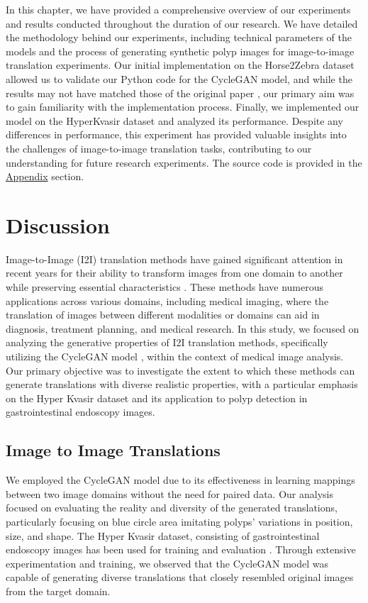 \documentclass[UKenglish,12pt]{master-style}
\begin{document}
In this chapter, we have provided a comprehensive overview of our experiments and results conducted throughout the duration of our research. We have detailed the methodology behind our experiments, including technical parameters of the models and the process of generating synthetic polyp images for image-to-image translation experiments. Our initial implementation on the Horse2Zebra dataset allowed us to validate our Python code for the CycleGAN model, and while the results may not have matched those of the original paper \cite{unpaired_horse2zebra_cyclgan}, our primary aim was to gain familiarity with the implementation process. Finally, we implemented our model on the HyperKvasir dataset and analyzed its performance. Despite any differences in performance, this experiment has provided valuable insights into the challenges of image-to-image translation tasks, contributing to our understanding for future research experiments. The source code is provided in the \hyperref[appendix]{Appendix} section. 

\chapter{Discussion}

Image-to-Image (I2I) translation methods have gained significant attention in recent years for their ability to transform images from one domain to another while preserving essential characteristics \cite{I2I} . These methods have numerous applications across various domains, including medical imaging, where the translation of images between different modalities or domains can aid in diagnosis, treatment planning, and medical research. In this study, we focused on analyzing the generative properties of I2I translation methods, specifically utilizing the CycleGAN model \cite{CycleGAN} , within the context of medical image analysis. Our primary objective was to investigate the extent to which these methods can generate translations with diverse realistic properties, with a particular emphasis on the Hyper Kvasir dataset and its application to polyp detection in gastrointestinal endoscopy images.

\section{Image to Image Translations}
We employed the CycleGAN model due to its effectiveness in learning mappings between two image domains without the need for paired data. 
Our analysis focused on evaluating the reality and diversity of the generated translations, particularly focusing on blue circle area imitating polyps' variations in position, size, and shape. The Hyper Kvasir dataset, consisting of gastrointestinal endoscopy images has been used for training and evaluation \cite{HyperKvasir_Dataset} . Through extensive experimentation and training, we observed that the CycleGAN model was capable of generating diverse translations that closely resembled original images from the target domain. 
\end{document}
